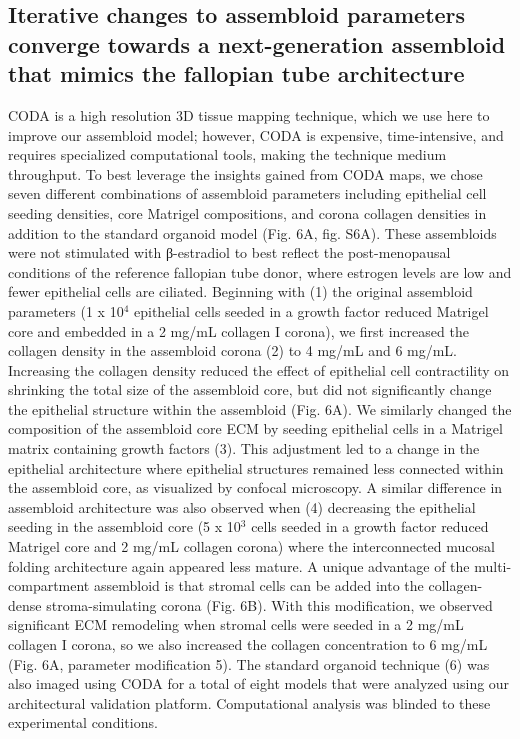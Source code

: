 \begin{refsection}
    \subsection{Iterative changes to assembloid parameters converge towards a next-generation assembloid that mimics the fallopian tube architecture}
    CODA is a high resolution 3D tissue mapping technique, which we use here to improve our assembloid model; however, CODA is expensive, time-intensive, and requires specialized computational tools, making the technique medium throughput. To best leverage the insights gained from CODA maps, we chose seven different combinations of assembloid parameters including epithelial cell seeding densities, core Matrigel compositions, and corona collagen densities in addition to the standard organoid model (Fig. 6A, fig. S6A). These assembloids were not stimulated with β-estradiol to best reflect the post-menopausal conditions of the reference fallopian tube donor, where estrogen levels are low\cite{brodowska2021a,elmlinger2002a,andrew2022a} and fewer epithelial cells are ciliated\cite{crow1994a,donnez1985a,brodowska2021a}. Beginning with (1) the original assembloid parameters (1 x 10$^4$ epithelial cells seeded in a growth factor reduced Matrigel core and embedded in a 2 mg/mL collagen I corona), we first increased the collagen density in the assembloid corona (2) to 4 mg/mL and 6 mg/mL. Increasing the collagen density reduced the effect of epithelial cell contractility on shrinking the total size of the assembloid core, but did not significantly change the epithelial structure within the assembloid (Fig. 6A). We similarly changed the composition of the assembloid core ECM by seeding epithelial cells in a Matrigel matrix containing growth factors (3). This adjustment led to a change in the epithelial architecture where epithelial structures remained less connected within the assembloid core, as visualized by confocal microscopy. A similar difference in assembloid architecture was also observed when (4) decreasing the epithelial seeding in the assembloid core (5 x 10$^3$ cells seeded in a growth factor reduced Matrigel core and 2 mg/mL collagen corona) where the interconnected mucosal folding architecture again appeared less mature. 
    A unique advantage of the multi-compartment assembloid is that stromal cells can be added into the collagen-dense stroma-simulating corona (Fig. 6B). With this modification, we observed significant ECM remodeling when stromal cells were seeded in a 2 mg/mL collagen I corona, so we also increased the collagen concentration to 6 mg/mL (Fig. 6A, parameter modification 5). The standard organoid technique (6) was also imaged using CODA for a total of eight models that were analyzed using our architectural validation platform. Computational analysis was blinded to these experimental conditions.

\end{refsection}
